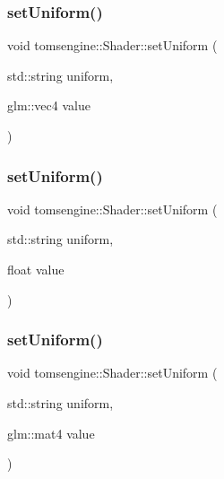 \subsubsection{\texorpdfstring{set\+Uniform()}{setUniform()}\hspace{0.1cm}{\footnotesize\ttfamily [1/4]}}
{\footnotesize\ttfamily void tomsengine\+::\+Shader\+::set\+Uniform (\begin{DoxyParamCaption}\item[{std\+::string}]{uniform,  }\item[{glm\+::vec4}]{value }\end{DoxyParamCaption})}

\mbox{\label{classtomsengine_1_1_shader_ac2273cc9e24be079c10bf957236044be}} 
\subsubsection{\texorpdfstring{set\+Uniform()}{setUniform()}\hspace{0.1cm}{\footnotesize\ttfamily [2/4]}}
{\footnotesize\ttfamily void tomsengine\+::\+Shader\+::set\+Uniform (\begin{DoxyParamCaption}\item[{std\+::string}]{uniform,  }\item[{float}]{value }\end{DoxyParamCaption})}

\mbox{\label{classtomsengine_1_1_shader_ae17443671c6e427199bc3da08b790438}} 
\subsubsection{\texorpdfstring{set\+Uniform()}{setUniform()}\hspace{0.1cm}{\footnotesize\ttfamily [3/4]}}
{\footnotesize\ttfamily void tomsengine\+::\+Shader\+::set\+Uniform (\begin{DoxyParamCaption}\item[{std\+::string}]{uniform,  }\item[{glm\+::mat4}]{value }\end{DoxyParamCaption})}

